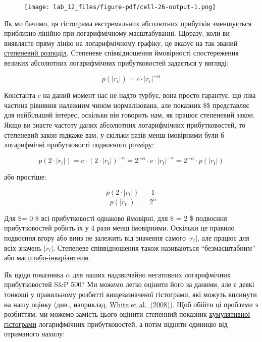 \documentclass[
  letterpaper,
]{report}
\begin{document}
\begin{figure}[H]

{\centering \texttt{[image: lab\_12\_files/figure-pdf/cell-26-output-1.png]}

}

\end{figure}

Як ми бачимо, ця гістограма екстремальних абсолютних прибутків
зменшується приблизно лінійно при логарифмічному масштабуванні. Щоразу,
коли ви виявляєте пряму лінію на логарифмічному графіку, це вказує на
так званий \href{https://en.wikipedia.org/wiki/Power_law}{степеневий
розподіл}. Степеневе співвідношення ймовірності спостереження великих
абсолютних логарифмічних прибутковостей задається у вигляді:

\[
p(|r_t|) = c \cdot |r_t|^{-\alpha}
\]

Константа \(c\) на даний момент нас не надто турбує, вона просто
гарантує, що ліва частина рівняння належним чином нормалізована, але
показник \$\alpha \$ представляє для найбільший інтерес, оскільки він
говорить нам, як працює степеневий закон. Якщо ви знаєте частоту даних
абсолютних логарифмічних прибутковостей, то степеневий закон підкаже
вам, у скільки разів менш імовірними були б логарифмічні прибутковості
подвоєного розміру:

\[
p(2 \cdot |r_t|) = c \cdot (2 \cdot |r_t|)^{-\alpha} = 2^{-\alpha} \cdot c \cdot |r_t|^{-\alpha} = 2^{-\alpha} \cdot p(|r_t|)
\]

або простіше:

\[
\frac{p(2 \cdot |r_t|)}{p(|r_t|)} = \frac{1}{2^{\alpha}}
\]

Для \$\alpha = 0 \$ всі прибутковості однаково ймовірні, для \$ \alpha =
2 \$ подвоєння прибутковостей робить їх у 4 рази менш імовірними.
Оскільки це правило подвоєння вгору або вниз не залежить від значення
самого \(\left| r_t \right|\), але працює для всіх значень
\(\left| r_t \right|\). Степеневе співвідношення також називаються
``безмасштабним'' або
\href{https://en.wikipedia.org/wiki/Scale_invariance}{масштабо-інваріантним}.

Як щодо показника \(\alpha\) для наших надзвичайно негативних
логарифмічних прибутковостей S\&P 500? Ми можемо легко оцінити його за
даними, але є деякі тонкощі у правильному розбитті вищезазначеної
гістограми, які можуть вплинути на нашу оцінку (див., наприклад,
\href{https://esajournals.onlinelibrary.wiley.com/doi/10.1890/07-1288.1}{White
et al.~(2008)}). Щоб обійти ці проблеми з розбиттям, ми можемо замість
цього оцінити степенний показник
\href{https://en.wikipedia.org/wiki/Histogram\#Cumulative_histogram}{кумулятивної
гістограми} логарифмічних прибутковостей, а потім відняти одиницю від
отриманого нахилу:
\end{document}
